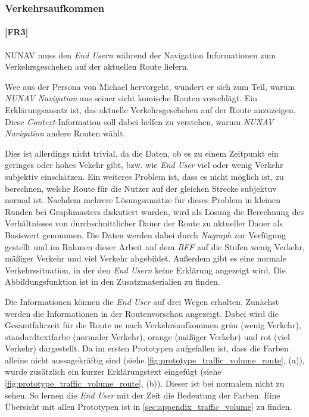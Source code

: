 \subsubsection{Verkehrsaufkommen}
\label{sec:traffic_volume_definition}

\paragraph{[FR3]} NUNAV muss den \textit{End Usern} während der Navigation Informationen zum Verkehrsgeschehen auf der aktuellen Route liefern.

Wee aus der Persona von Michael hervorgeht, wundert er sich zum Teil, warum \textit{NUNAV Navigation} aus seiner sicht \glqq komische\grqq{} Routen vorschlägt. Ein Erklärungsansatz ist, das aktuelle Verkehrsgeschehen auf der Route anzuzeigen. Diese \textit{Context}-Information soll dabei helfen zu verstehen, warum \textit{NUNAV Navigation} andere Routen wählt. 

Dies ist allerdings nicht trivial, da die Daten, ob es zu einem Zeitpunkt ein geringes oder hohes Vekehr gibt, bzw. wie \textit{End User} viel oder wenig Verkehr subjektiv einschätzen. Ein weiteres Problem ist, dass es nicht möglich ist, zu berechnen, welche Route für die Nutzer auf der gleichen Strecke subjektuv \glqq normal\grqq{} ist. Nachdem mehrere Lösungsansätze für dieses Problem in kleinen Runden bei Graphmasters diskutiert wurden, wird als Lösung die Berechnung des Verhältnisses von durchschnittlicher Dauer der Route zu aktueller Dauer als Basiswert genommen. Die Daten werden dabei durch \textit{Nugraph} zur Verfügung gestellt und im Rahmen dieser Arbeit auf dem \textit{BFF} auf die Stufen \glqq wenig Verkehr\grqq{}, \glqq mäßiger Verkehr\grqq{} und \glqq viel Verkehr\grqq{} abgebildet. Außerdem gibt es eine \glqq normale\grqq{} Verkehrssituation, in der den \textit{End Usern} keine Erklärung angezeigt wird. Die Abbildungsfunktion ist in den Zusatzmaterialien zu finden.

Die Informationen können die \textit{End User} auf drei Wegen erhalten. Zunächst werden die Informationen in der Routenvorschau angezeigt. Dabei wird die Gesamtfahrzeit für die Route ne nach Verkehrsaufkommen grün (wenig Verkehr), standardtextfarbe (normaler Verkehr), orange (mäßiger Verkehr) und rot (viel Verkehr) dargestellt. Da im ersten Prototypen aufgefallen ist, dass die Farben alleine nicht aussagekräftig sind (siehe \autoref{fig:prototype_traffic_volume_route}, (a)), wurde zusätzlich ein kurzer Erklärungstext eingefügt (siehe \autoref{fig:prototype_traffic_volume_route}, (b)). Dieser ist bei \glqq normalem\grqq{} nicht zu sehen. So lernen die \textit{End User} mit der Zeit die Bedeutung der Farben. Eine Übersicht mit allen Prototypen ist in \autoref{sec:appendix_traffic_volume} zu finden.


